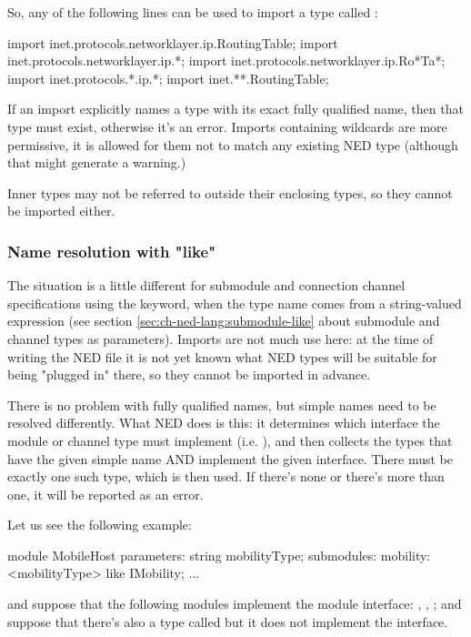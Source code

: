 So, any of the following lines can be used to import a type called
:

\begin{ned}
import inet.protocols.networklayer.ip.RoutingTable;
import inet.protocols.networklayer.ip.*;
import inet.protocols.networklayer.ip.Ro*Ta*;
import inet.protocols.*.ip.*;
import inet.**.RoutingTable;
\end{ned}

If an import explicitly names a type with its exact fully qualified name,
then that type must exist, otherwise it's an error. Imports containing
wildcards are more permissive, it is allowed for them not to match any
existing NED type (although that might generate a warning.)

Inner types may not be referred to outside their enclosing types, so they
cannot be imported either.


\subsubsection{Name resolution with "like"}

The situation is a little different for submodule and connection channel
specifications using the  keyword, when the type name comes
from a string-valued expression (see section
\ref{sec:ch-ned-lang:submodule-like} about submodule and channel types as
parameters). Imports are not much use here: at the time of writing the NED
file it is not yet known what NED types will be suitable for being "plugged
in" there, so they cannot be imported in advance.

There is no problem with fully qualified names, but simple names need
to be resolved differently. What NED does is this: it determines which
interface the module or channel type must implement (i.e. ),
and then collects the types that have the given simple name AND implement
the given interface. There must be exactly one such type, which is then used.
If there's none or there's more than one, it will be reported as an error.

Let us see the following example:

\begin{ned}
module MobileHost
{
    parameters:
        string mobilityType;
    submodules:
        mobility: <mobilityType> like IMobility;
        ...
}
\end{ned}

and suppose that the following modules implement the  module
interface: , ,
; and suppose that there's also a type
called  but it does not implement the
interface.

